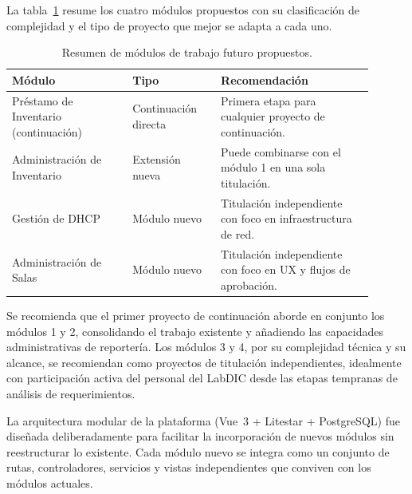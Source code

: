 La tabla~\ref{tab:trabajo_futuro_resumen} resume los cuatro módulos propuestos con su 
clasificación de complejidad y el tipo de proyecto que mejor se adapta a cada uno.

\begin{table}[H]
	\centering
	\begin{tabular}{p{0.30\linewidth} p{0.22\linewidth} p{0.38\linewidth}}
		\hline
		\textbf{Módulo} & \textbf{Tipo} & \textbf{Recomendación} \\
		\hline
		Préstamo de Inventario (continuación) 
		& Continuación directa 
		& Primera etapa para cualquier proyecto de continuación. \\
		\hline
		Administración de Inventario 
		& Extensión nueva 
		& Puede combinarse con el módulo 1 en una sola titulación. \\
		\hline
		Gestión de DHCP 
		& Módulo nuevo 
		& Titulación independiente con foco en infraestructura de red. \\
		\hline
		Administración de Salas 
		& Módulo nuevo 
		& Titulación independiente con foco en UX y flujos de aprobación. \\
		\hline
	\end{tabular}
	\caption{Resumen de módulos de trabajo futuro propuestos.}
	\label{tab:trabajo_futuro_resumen}
\end{table}

Se recomienda que el primer proyecto de continuación aborde en conjunto los módulos 1 
y 2, consolidando el trabajo existente y añadiendo las capacidades administrativas de 
reportería. Los módulos 3 y 4, por su complejidad técnica y su alcance, se recomiendan 
como proyectos de titulación independientes, idealmente con participación activa del 
personal del LabDIC desde las etapas tempranas de análisis de requerimientos.

La arquitectura modular de la plataforma (Vue~3 + Litestar + PostgreSQL) fue 
diseñada deliberadamente para facilitar la incorporación de nuevos módulos sin 
reestructurar lo existente. Cada módulo nuevo se integra como un conjunto de rutas, 
controladores, servicios y vistas independientes que conviven con los módulos 
actuales.